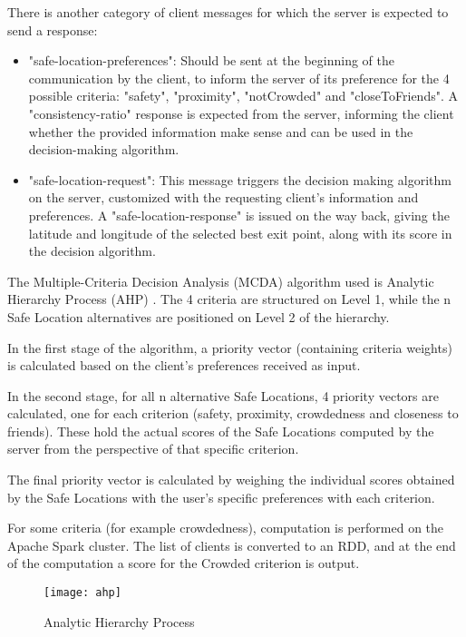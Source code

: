 There is another category of client messages for which the server is expected
to send a response:

\begin{itemize}
  \item "safe-location-preferences": Should be sent at the beginning of the
        communication by the client, to inform the server of its preference
        for the 4 possible criteria: "safety", "proximity", "notCrowded" and
        "closeToFriends". A "consistency-ratio" response is expected from the
        server, informing the client whether the provided information make
        sense and can be used in the decision-making algorithm.
  \item "safe-location-request": This message triggers the decision making
        algorithm on the server, customized with the requesting client's
        information and preferences. A "safe-location-response" is issued on
        the way back, giving the latitude and longitude of the selected best
        exit point, along with its score in the decision algorithm.
\end{itemize}

The Multiple-Criteria Decision Analysis (MCDA) algorithm used is Analytic
Hierarchy Process (AHP) \cite{ahp}. The 4 criteria are structured on Level 1,
while the n Safe Location alternatives are positioned on Level 2 of the
hierarchy.

In the first stage of the algorithm, a priority vector (containing criteria
weights) is calculated based on the client's preferences received as input.

In the second stage, for all n alternative Safe Locations, 4 priority vectors
are calculated, one for each criterion (safety, proximity, crowdedness and
closeness to friends). These hold the actual scores of the Safe Locations
computed by the server from the perspective of that specific criterion.

The final priority vector is calculated by weighing the individual scores
obtained by the Safe Locations with the user's specific preferences with each
criterion.

For some criteria (for example crowdedness), computation is performed on the
Apache Spark cluster. The list of clients is converted to an RDD, and at the
end of the computation a score for the Crowded criterion is output.

\begin{figure}
\centering
\texttt{[image: ahp]}
\caption{\label{fig:ahp} Analytic Hierarchy Process}
\end{figure}

